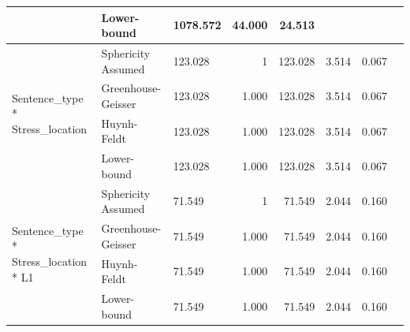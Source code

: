 \documentclass[a4paper]{article}
\begin{document}
\begin{table}[H]
\begin{tabular}{p{}p{}|l|r|r|r|r|r|}
\cline{2-7}
                                                        & Lower-bound        & 1078.572                                     & 44.000                  & 24.513                           & \multicolumn{1}{l|}{~} & \multicolumn{1}{l|}{~}     \\ 
\hline
\multirow{4}{*}{Sentence\_type * Stress\_location}      & Sphericity Assumed & 123.028                                      & 1                       & 123.028                          & 3.514                  & 0.067                      \\ 
\cline{2-7}
                                                        & Greenhouse-Geisser & 123.028                                      & 1.000                   & 123.028                          & 3.514                  & 0.067                      \\ 
\cline{2-7}
                                                        & Huynh-Feldt        & 123.028                                      & 1.000                   & 123.028                          & 3.514                  & 0.067                      \\ 
\cline{2-7}
                                                        & Lower-bound        & 123.028                                      & 1.000                   & 123.028                          & 3.514                  & 0.067                      \\ 
\hline
\multirow{4}{*}{Sentence\_type * Stress\_location * L1} & Sphericity Assumed & 71.549                                       & 1                       & 71.549                           & 2.044                  & 0.160                      \\ 
\cline{2-7}
                                                        & Greenhouse-Geisser & 71.549                                       & 1.000                   & 71.549                           & 2.044                  & 0.160                      \\ 
\cline{2-7}
                                                        & Huynh-Feldt        & 71.549                                       & 1.000                   & 71.549                           & 2.044                  & 0.160                      \\ 
\cline{2-7}
                                                        & Lower-bound        & 71.549                                       & 1.000                   & 71.549                           & 2.044                  & 0.160                      \\ 

\end{tabular}
\end{table}
\end{document}
